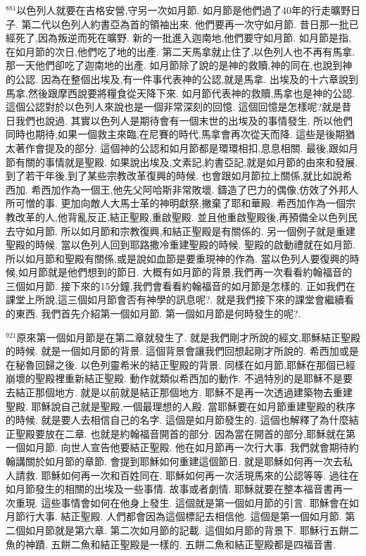 \documentclass{book}
\begin{document}
$^{881}$以色列人就要在吉格安營,守另一次如月節.
如月節是他們過了40年的行走曠野日子.
第二代以色列人約書亞為首的領袖出來.
他們要再一次守如月節.
昔日那一批已經死了,因為叛逆而死在曠野.
新的一批進入迦南地,他們要守如月節.
如月節是指,在如月節的次日,他們吃了地的出產.
第二天馬拿就止住了,以色列人也不再有馬拿.
那一天他們卻吃了迦南地的出產.
如月節除了說的是神的救贖,神的同在,也說到神的公認.
因為在整個出埃及,有一件事代表神的公認,就是馬拿.
出埃及的十六章說到馬拿,然後跟摩西說要將糧食從天降下來.
如月節代表神的救贖,馬拿也是神的公認.
這個公認對於以色列人來說也是一個非常深刻的回憶.
這個回憶是怎樣呢?就是昔日我們也說過.
其實以色列人是期待會有一個末世的出埃及的事情發生.
所以他們同時也期待,如果一個救主來臨,在尼賽的時代,馬拿會再次從天而降.
這些是後期猶太著作會提及的部分.
這個神的公認和如月節都是環環相扣,息息相關.
最後,跟如月節有關的事情就是聖殿.
如果說出埃及,文素記,約書亞記,就是如月節的由來和發展.
到了若干年後,到了某些宗教改革復興的時候.
也會跟如月節拉上關係,就比如說希西加.
希西加作為一個王,他先父阿哈斯非常敗壞.
鑄造了巴力的偶像,仿效了外邦人所可憎的事.
更加向敵人大馬士革的神明獻祭,撇棄了耶和華殿.
希西加作為一個宗教改革的人,他背亂反正,結正聖殿,重啟聖殿.
並且他重啟聖殿後,再預備全以色列民去守如月節.
所以如月節和宗教復興,和結正聖殿是有關係的.
另一個例子就是重建聖殿的時候.
當以色列人回到耶路撒冷重建聖殿的時候.
聖殿的啟動禮就在如月節.
所以如月節和聖殿有關係,或是說如血節是要重現神的作為.
當以色列人要復興的時候,如月節就是他們想到的節日.
大概有如月節的背景,我們再一次看看約翰福音的三個如月節.
接下來的15分鐘,我們會看看約翰福音的如月節是怎樣的.
正如我們在課堂上所說,這三個如月節會否有神學的訊息呢?.
就是我們接下來的課堂會繼續看的東西.
我們首先介紹第一個如月節.
第一個如月節是何時發生的呢?.

$^{921}$原來第一個如月節是在第二章就發生了.
就是我們剛才所說的經文,耶穌結正聖殿的時候.
就是一個如月節的背景.
這個背景會讓我們回想起剛才所說的.
希西加或是在秘魯回歸之後.
以色列靈希米的結正聖殿的背景.
同樣在如月節,耶穌在那個已經崩壞的聖殿裡重新結正聖殿.
動作就類似希西加的動作.
不過特別的是耶穌不是要去結正那個地方.
就是以前就是結正那個地方.
耶穌不是再一次透過建築物去重建聖殿.
耶穌說自己就是聖殿,一個最理想的人殿.
當耶穌要在如月節重建聖殿的秩序的時候.
就是要人去相信自己的名字.
這個是如月節發生的.
這個也解釋了為什麼結正聖殿要放在二章.
也就是約翰福音開首的部分.
因為當在開首的部分,耶穌就在第一個如月節.
向世人宣告他要結正聖殿.
他在如月節再一次行大事.
我們就會期待約翰講關於如月節的章節.
會提到耶穌如何重建這個節日.
就是耶穌如何再一次去私人請救.
耶穌如何再一次和百姓同在.
耶穌如何再一次活現馬來的公認等等.
過往在如月節發生的相關的出埃及一些事情.
故事或者劇情.
耶穌就要在整本福音書再一次重現.
這些事情會如何在他身上發生.
這個就是第一個如月節的引言.
耶穌會在如月節行大事.
結正聖殿.
人們都會因為這個標記去相信他.
這個是第一個如月節.
第二個如月節就是第六章.
第二次如月節的記載.
這個如月節的背景下.
耶穌行五餅二魚的神蹟.
五餅二魚和結正聖殿是一樣的.
五餅二魚和結正聖殿都是四福音書.
\end{document}
